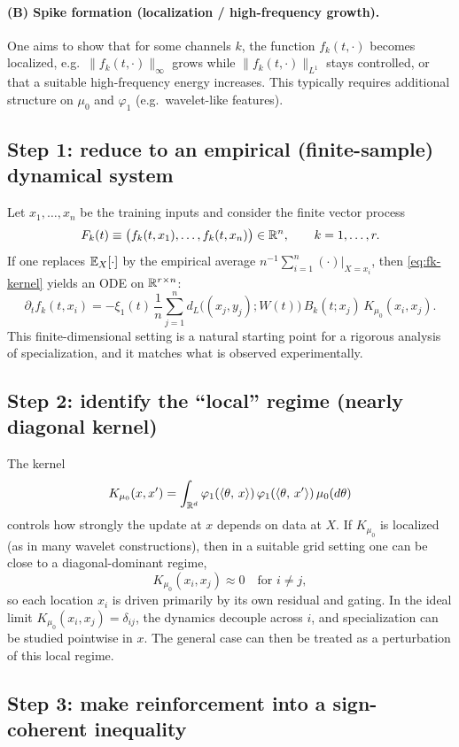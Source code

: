 \paragraph{(B) Spike formation (localization / high-frequency growth).}
One aims to show that for some channels $k$, the function $f_k(t,\cdot)$ becomes localized, e.g.\ $\|f_k(t,\cdot)\|_{\infty}$ grows while $\|f_k(t,\cdot)\|_{L^1}$ stays controlled, or that a suitable high-frequency energy increases.
This typically requires additional structure on $\mu_0$ and $\varphi_1$ (e.g.\ wavelet-like features).

\subsection{Step 1: reduce to an empirical (finite-sample) dynamical system}

Let $x_1,\dots,x_n$ be the training inputs and consider the finite vector process
\[
F_k(t)\equiv \big(f_k(t,x_1),\dots,f_k(t,x_n)\big)\in\mathbb{R}^n,\qquad k=1,\dots,r.
\]
If one replaces $\mathbb{E}_X[\cdot]$ by the empirical average $n^{-1}\sum_{i=1}^n (\cdot)\big|_{X=x_i}$, then \eqref{eq:fk-kernel} yields an ODE on $\mathbb{R}^{r\times n}$:
\[
\partial_t f_k(t,x_i)=-\xi_1(t)\,\frac{1}{n}\sum_{j=1}^n d_L\big((x_j,y_j);W(t)\big)\,B_k(t;x_j)\,K_{\mu_0}(x_i,x_j).
\]
This finite-dimensional setting is a natural starting point for a rigorous analysis of specialization, and it matches what is observed experimentally.

\subsection{Step 2: identify the ``local'' regime (nearly diagonal kernel)}

The kernel
\[
K_{\mu_0}(x,x')=\int_{\mathbb{R}^d}\varphi_1(\left\langle \theta,\,x \right\rangle)\,\varphi_1(\left\langle \theta,\,x' \right\rangle)\,\mu_0(d\theta)
\]
controls how strongly the update at $x$ depends on data at $X$.
If $K_{\mu_0}$ is localized (as in many wavelet constructions), then in a suitable grid setting one can be close to a diagonal-dominant regime,
\[
K_{\mu_0}(x_i,x_j)\approx 0\quad\text{for }i\neq j,
\]
so each location $x_i$ is driven primarily by its own residual and gating.
In the ideal limit $K_{\mu_0}(x_i,x_j)=\delta_{ij}$, the dynamics decouple across $i$, and specialization can be studied pointwise in $x$.
The general case can then be treated as a perturbation of this local regime.

\subsection{Step 3: make reinforcement into a sign-coherent inequality}

